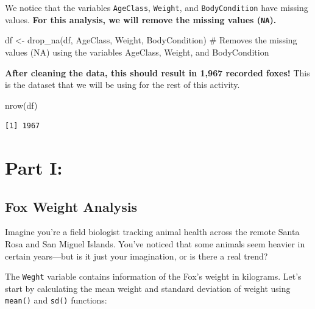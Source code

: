 \documentclass[
  letterpaper,
]{report}
\newenvironment{Shaded}{\begin{snugshade}}{\end{snugshade}}
\newcommand{\CommentTok}[1]{\textcolor[rgb]{0.37,0.37,0.37}{#1}}
\newcommand{\FunctionTok}[1]{\textcolor[rgb]{0.28,0.35,0.67}{#1}}
\newcommand{\NormalTok}[1]{\textcolor[rgb]{0.00,0.23,0.31}{#1}}
\newcommand{\OtherTok}[1]{\textcolor[rgb]{0.00,0.23,0.31}{#1}}
\newcommand{\SpecialCharTok}[1]{\textcolor[rgb]{0.37,0.37,0.37}{#1}}
\begin{document}
We notice that the variables \texttt{AgeClass}, \texttt{Weight}, and
\texttt{BodyCondition} have missing values. \textbf{For this analysis,
we will remove the missing values (\texttt{NA}).}

\begin{Shaded}
\begin{Highlighting}[]
\NormalTok{df }\OtherTok{\textless{}{-}} \FunctionTok{drop\_na}\NormalTok{(df, AgeClass, Weight, BodyCondition) }\CommentTok{\# Removes the missing values (NA) using the variables AgeClass, Weight, and BodyCondition}
\end{Highlighting}
\end{Shaded}

\textbf{After cleaning the data, this should result in 1,967 recorded
foxes!} This is the dataset that we will be using for the rest of this
activity.

\begin{Shaded}
\begin{Highlighting}[]
\FunctionTok{nrow}\NormalTok{(df)}
\end{Highlighting}
\end{Shaded}

\begin{verbatim}
[1] 1967
\end{verbatim}

\section{Part I:}\label{part1}

\subsection{Fox Weight Analysis}\label{fox-weight}

Imagine you're a field biologist tracking animal health across the
remote Santa Rosa and San Miguel Islands. You've noticed that some
animals seem heavier in certain years---but is it just your imagination,
or is there a real trend?

The \texttt{Weght} variable contains information of the Fox's weight in
kilograms. Let's start by calculating the mean weight and standard
deviation of weight using \texttt{mean()} and \texttt{sd()} functions:

\begin{Shaded}
\end{Shaded}
\end{document}
